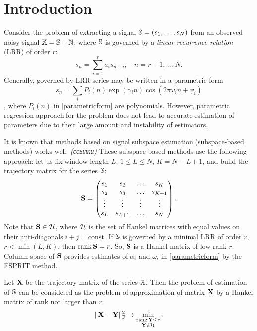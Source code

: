 \documentclass[12pt,a4paper,fleqn,leqno]{article}
\def\rank{\mathop{\mathrm{rank}}}
\begin{document}
\section{Introduction}
Consider the problem of extracting a signal $\mathbb{S} = (s_1, \ldots, s_N)$ from an observed noisy signal $\mathbb{X} = \mathbb{S} + \mathbb{N}$, where $\mathbb{S}$ is governed by a \emph{linear recurrence relation} (LRR) of order $r$:
\begin{equation*}
s_n = \sum_{i = 1}^{r} a_i s_{n-i}, \quad n = r + 1, \ldots, N.
\end{equation*}
Generally, governed-by-LRR series may be written in a parametric form 
\begin{equation} \label{parametricform}
s_n = \sum_i P_i(n) \exp(\alpha_i n) \cos(2 \pi \omega_i n + \psi_i)
\end{equation}, where $P_i(n)$ in \eqref{parametricform} are polynomials. However, parametric regression approach for the problem does not lead to accurate estimation of parameters due to their large amount and instability of estimators.

It is known that methods based on signal subspace estimation (subspace-based methods) works well. \emph{(ссылки)} These subspace-based methods use the following approach: let us fix window length $L$, $1 \le L \le N$, $K = N - L + 1$, and build the trajectory matrix for the series $\mathbb{S}$:
\begin{equation*}
\mathbf{S} = \begin{pmatrix}
s_1 & s_2 & \ldots & s_K \\
s_2 & s_3 & \ldots & s_{K + 1} \\
\vdots & \vdots & \vdots & \vdots \\
s_L & s_{L + 1} & \ldots & s_N
\end{pmatrix}.
\end{equation*}
Note that $\mathbf{S}\in \mathcal{H}$, where $\mathcal{H}$ is the set of Hankel matrices with equal values on their anti-diagonals $i+j=\mathrm{const}$.
If $\mathbb{S}$ is governed by a minimal LRR of order $r$, $r < \min(L, K)$, then $\rank \bfS = r$. So, $\mathbf{S}$ is a Hankel matrix of low-rank $r$. Column space of $\mathbf{S}$ provides estimates of $\alpha_i$ and $\omega_i$ in \eqref{parametricform} by the ESPRIT method.

Let $\mathbf{X}$ be the trajectory matrix of the series $\mathbb{X}$. Then the problem of estimation of $\mathbb{S}$ can be considered as the problem of approximation of matrix $\mathbf{X}$ by a Hankel matrix of rank not larger than $r$:
\begin{equation}\label{introd_task}
\|\bfX - \bfY\|^2_\rmF \to \min_{\substack{\rank \bfY \le r \\ \bfY \in \calH}}.
\end{equation}
\end{document}
